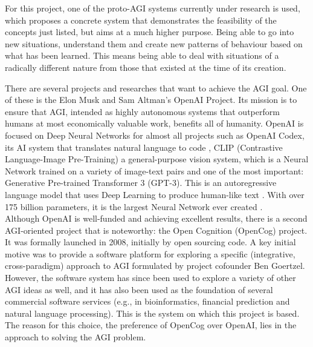 For this project, one of the proto-AGI\footnotemark{} systems currently under research is used, which proposes a concrete system that demonstrates the feasibility of the concepts just listed, but aims at a much higher purpose. Being able to go into new situations, understand them and create new patterns of behaviour based on what has been learned. This means being able to deal with situations of a radically different nature from those that existed at the time of its creation. \\

There are several projects and researches that want to achieve the AGI goal. One of these is the Elon Musk and Sam Altman's OpenAI Project. 
Its mission is to ensure that AGI, intended as highly autonomous systems that outperform humans at most economically valuable work, benefits all of humanity.
OpenAI is focused on Deep Neural Networks for almost all projects such as OpenAI Codex, its AI system that translates natural language to code \cite{DBLP:journals/corr/abs-2107-03374}, CLIP (Contrastive Language-Image Pre-Training) a general-purpose vision system, which is a Neural Network trained on a variety of image-text pairs \cite{DBLP:journals/corr/abs-2103-00020} and one of the most important: Generative Pre-trained Transformer 3 (GPT-3). This is an autoregressive language model that uses Deep Learning to produce human-like text \cite{DBLP:journals/corr/abs-2005-14165}. With over 175 billion parameters, it is the largest Neural Network ever created \cite{romero_2021}. \\
Although OpenAI is well-funded and achieving excellent results, there is a second AGI-oriented project that is noteworthy: the Open Cognition (OpenCog) project. It was formally launched in 2008, initially by open sourcing code. A key initial motive was to provide a software platform for exploring a specific (integrative, cross-paradigm) approach to AGI formulated by project cofounder Ben Goertzel. However, the software system has since been used to explore a variety of other AGI ideas as well, and it has also been used as the foundation of several commercial software services (e.g., in bioinformatics, financial prediction and natural language processing). This is the system on which this project is based. \\
The reason for this choice, the preference of OpenCog over OpenAI, lies in the approach to solving the AGI problem.\\
